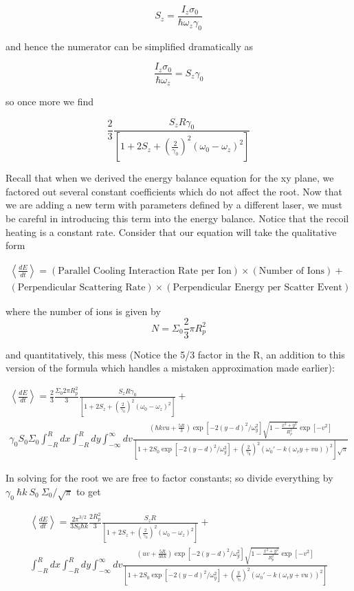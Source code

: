 \documentclass[11pt, oneside,reqno]{amsart}   	%
\newcommand{\eqn}[1]{\begin{equation}#1 \end{equation}}
\begin{document}
\eqn{ S_z = \frac{I_z \sigma_0}{\hbar \omega_z \gamma_0}}

and hence the numerator can be simplified dramatically as

\eqn{ \frac{I_z \sigma_0}{\hbar \omega_z} = S_z \gamma_0}

so once more we find

\eqn{ \frac{2}{3} \frac{S_z R \gamma_0}{\left[ 1 + 2S_z+ \left(\frac{2}{\gamma_0}\right)^2(\omega_0 -\omega_z)^2 \right]}}

Recall that when we derived the energy balance equation for the xy plane, we factored out several constant coefficients which do not affect the root. Now that we are adding a new term with parameters defined by a different laser, we must be careful in introducing this term into the energy balance. Notice that the recoil heating is a constant rate. Consider that our equation will take the qualitative form 

\begin{multline}
 \left< \frac{dE}{dt} \right> = (\text{Parallel Cooling Interaction Rate per Ion}) \times (\text{Number of Ions}) +\\ (\text{Perpendicular Scattering Rate}) \times (\text{Perpendicular Energy per Scatter Event})
\end{multline}

where the number of ions is given by \eqn{N= \Sigma_0 \frac{2}{3} \pi R_p^2}

and quantitatively, this mess (Notice the 5/3 factor in the R, an addition to this version of the formula which handles a mistaken approximation made earlier):

\begin{multline}
 \left< \frac{dE}{dt} \right> =
\frac{2}{3} \frac{\Sigma_0 2 \pi R_p^2}{3} \frac{S_z R \gamma_0}{\left[ 1 + 2S_z+ \left(\frac{2}{\gamma_0}\right)^2(\omega_0 -\omega_z)^2 \right]}+ \\
\gamma_0 S_0 \Sigma_0
 \int_{-R}^{R} dx \int_{-R}^R  dy \int_{-\infty}^{\infty} dv 
 \frac{
 (\hbar kv u+\frac{5R}{3 })
 \exp [ -2 (y-d)^2/\omega_y^2] \sqrt{1-\frac{x^2+y^2}{R_p^2}} \exp [-v^2]
 }
 { \left[ 1+2S_0 \exp [ -2 (y-d)^2/\omega_y^2] +\left( \frac{2}{\gamma_0} \right)^2  (\omega_0' - k(\omega_r y +v u))^2 \right]\sqrt{\pi}}
\end{multline}

In solving for the root we are free to factor constants; so divide everything by $ \gamma_0 \ \hbar k \ S_0  \ \Sigma_0 / \sqrt{\pi}$ to get

\begin{multline}
 \left< \frac{dE}{dt} \right> =
\frac{2 \pi ^{3/2}}{3 S_0 \hbar k } \frac{2R_p^2}{3} \frac{S_z   R}{\left[ 1 + 2S_z+ \left(\frac{2}{\gamma_0}\right)^2(\omega_0 -\omega_z)^2 \right]}+ \\
  \int_{-R}^{R} dx \int_{-R}^R  dy \int_{-\infty}^{\infty} dv 
 \frac{
 (u v+\frac{5R}{3 \hbar k })
 \exp [ -2 (y-d)^2/\omega_y^2] \sqrt{1-\frac{x^2+y^2}{R_p^2}} \exp [-v^2]
 }
 { \left[ 1+2S_0 \exp [ -2 (y-d)^2/\omega_y^2] +\left( \frac{2}{\gamma_0} \right)^2  (\omega_0' - k(\omega_r y +v u))^2 \right]}
\end{multline}
 
\end{document}
